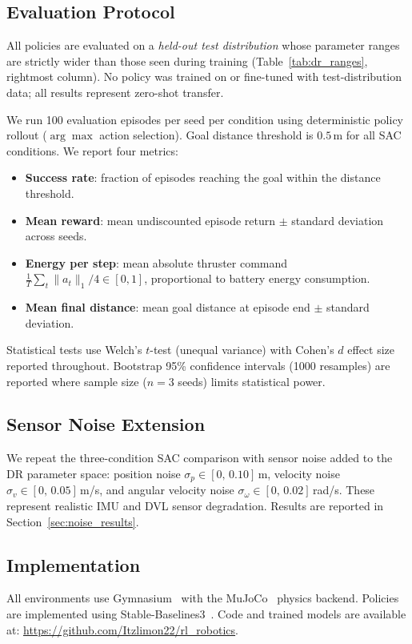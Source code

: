 \subsection{Evaluation Protocol}

All policies are evaluated on a \emph{held-out test distribution}
whose parameter ranges are strictly wider than those seen during training
(Table~\ref{tab:dr_ranges}, rightmost column).
No policy was trained on or fine-tuned with test-distribution data;
all results represent zero-shot transfer.

We run 100 evaluation episodes per seed per condition using deterministic
policy rollout ($\arg\max$ action selection).
Goal distance threshold is $0.5$\,m for all SAC conditions.
We report four metrics:

\begin{itemize}
\item \textbf{Success rate}: fraction of episodes reaching the goal
  within the distance threshold.
\item \textbf{Mean reward}: mean undiscounted episode return $\pm$
  standard deviation across seeds.
\item \textbf{Energy per step}: mean absolute thruster command
  $\frac{1}{T}\sum_t \|a_t\|_1 / 4 \in [0, 1]$,
  proportional to battery energy consumption.
\item \textbf{Mean final distance}: mean goal distance at episode end
  $\pm$ standard deviation.
\end{itemize}

Statistical tests use Welch's $t$-test (unequal variance) with
Cohen's $d$ effect size reported throughout.
Bootstrap 95\% confidence intervals (1000 resamples) are reported
where sample size ($n = 3$ seeds) limits statistical power.

\subsection{Sensor Noise Extension}
\label{sec:master_setup}

We repeat the three-condition SAC comparison with sensor noise added
to the DR parameter space:
position noise $\sigma_p \in [0,\,0.10]$\,m,
velocity noise $\sigma_v \in [0,\,0.05]$\,m/s,
and angular velocity noise $\sigma_\omega \in [0,\,0.02]$\,rad/s.
These represent realistic IMU and DVL sensor degradation.
Results are reported in Section~\ref{sec:noise_results}.

\subsection{Implementation}

All environments use Gymnasium~\cite{gymnasium} with the MuJoCo~\cite{mujoco}
physics backend.
Policies are implemented using Stable-Baselines3~\cite{stable_baselines3}.
Code and trained models are available at:
\url{https://github.com/Itzlimon22/rl_robotics}.